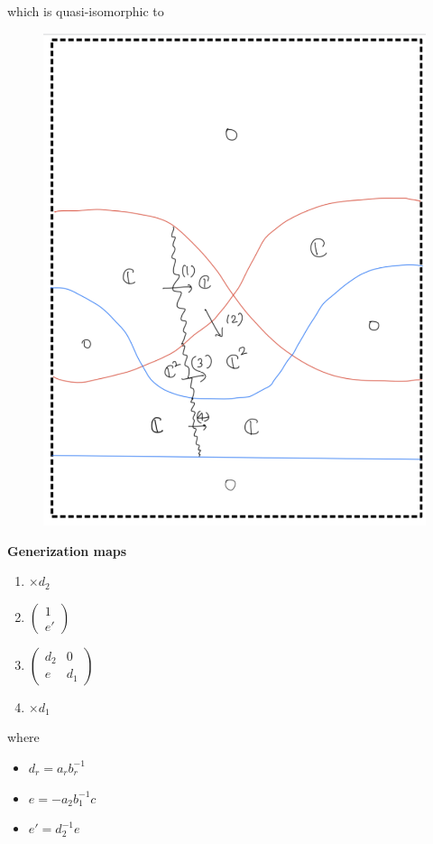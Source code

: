 \begin{enumerate}[label = (\roman*)]
\begin{enumerate}[label = (Step \arabic*)]
which is quasi-isomorphic to
\begin{figure}[H]
    \centering
    \includegraphics[scale = 0.95]{diagrams/cobord_gen/base_7.png}
    \caption{}
    \label{fig:your-label}
\end{figure}
\textbf{Generization maps}
\begin{enumerate}[label = (\arabic*)]
\item $\times d_2$

\item 
$\begin{pmatrix}
1 \\
e' 
\end{pmatrix}$

\item 
$\begin{pmatrix}
d_2 & 0 \\
e & d_1
\end{pmatrix}$

\item $\times d_1$
\end{enumerate}
where
\begin{itemize}
\item $d_r = a_rb_r^{-1}$
\item $e = -a_2b_1^{-1}c$
\item $e' = d_2^{-1}e$
\end{itemize}
\end{enumerate}


\end{enumerate}
